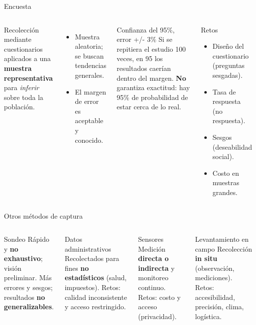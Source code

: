 \documentclass[aspectratio=169]{beamer}
\begin{document}
\begin{frame}{Encuesta}
  \begin{columns}[t]
      Recolecci\'on mediante cuestionarios aplicados a una \textbf{muestra
      representativa} para \emph{inferir} sobre toda la poblaci\'on.
      \begin{itemize}
        \item Muestra aleatoria; se buscan tendencias generales.
        \item El margen de error es aceptable y conocido.
      \end{itemize}
      \begin{block}{Confianza del 95\%, error +/- 3\%}
        Si se repitiera el estudio 100 veces, en 95 los resultados caer\'ian
        dentro del margen. \textbf{No} garantiza exactitud: hay 95\% de
        probabilidad de estar cerca de lo real.
      \end{block}
      \begin{block}{Retos}
        \begin{itemize}
          \item Dise\~no del cuestionario (preguntas sesgadas).
          \item Tasa de respuesta (no respuesta).
          \item Sesgos (deseabilidad social).
          \item Costo en muestras grandes.
        \end{itemize}
      \end{block}
  \end{columns}
\end{frame}

\begin{frame}{Otros m\'etodos de captura}
  \begin{columns}[t]
      \begin{block}{Sondeo}
        R\'apido y \textbf{no exhaustivo}; visi\'on preliminar. M\'as errores y
        sesgos; resultados \textbf{no generalizables}.
      \end{block}
      \begin{block}{Datos administrativos}
        Recolectados para fines \textbf{no estad\'isticos} (salud, impuestos).
        Retos: calidad inconsistente y acceso restringido.
      \end{block}
      \begin{block}{Sensores}
        Medici\'on \textbf{directa o indirecta} y monitoreo continuo. Retos:
        costo y acceso (privacidad).
      \end{block}
      \begin{block}{Levantamiento en campo}
        Recolecci\'on \textbf{in situ} (observaci\'on, mediciones). Retos:
        accesibilidad, precisi\'on, clima, log\'istica.
      \end{block}
  \end{columns}
\end{frame}
\end{document}
